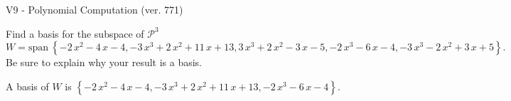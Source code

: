 \begin{exercise}
  \begin{exerciseTitle}V9 - Polynomial Computation (ver. 771)\end{exerciseTitle}
  \begin{exerciseStatement}
    Find a basis for the subspace of \(\mathcal{P}^3\) 
\[W=\mathrm{span}\ \left\{-2 \, x^{2} - 4 \, x - 4 , -3 \, x^{3} + 2 \, x^{2} + 11 \, x + 13 , 3 \, x^{3} + 2 \, x^{2} - 3 \, x - 5 , -2 \, x^{3} - 6 \, x - 4 , -3 \, x^{3} - 2 \, x^{2} + 3 \, x + 5\right\}.\]
 Be sure to explain why your result is a basis.


  \end{exerciseStatement}
  \begin{exerciseAnswer}
   A basis of \(W\) is  \(\left\{-2 \, x^{2} - 4 \, x - 4 , -3 \, x^{3} + 2 \, x^{2} + 11 \, x + 13 , -2 \, x^{3} - 6 \, x - 4\right\}\).
  


  \end{exerciseAnswer}
\end{exercise}
